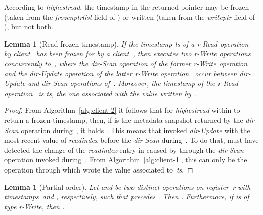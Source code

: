\documentclass[oribibl]{llncs}
\newtheorem{lemma}[theorem]{Lemma}
\theoremstyle{definition-boldhead}
\newcommand{\var}[1]{\textit{#1}}
\newcommand{\op}[1]{\textsl{#1}}
\newcommand{\dir}{\var{dir}\xspace}
\begin{document}
According to \op{highestread}, the timestamp in the returned pointer
may be frozen (taken from the \var{frozenptrlist} field of ) or written
(taken from the \var{writeptr} field of ), but not both.

\begin{lemma}[Read frozen timestamp]\label{lem:readfrozen}
  If the timestamp \var{ts} of a \var{r}-\op{Read} operation~ by
  client~ has been frozen for  by a client~, then 
  executes two \var{r}-\op{Write} operations concurrently to~,
  where the \dir-\op{Scan} operation of the former \var{r}-\op{Write}
  operation~ and the \dir-\op{Update} operation of the latter
  \var{r}-\op{Write} operation~ occur between
  \dir-\op{Update} and \dir-\op{Scan} operations of~.  Moreover,
  the timestamp of the \var{r}-\op{Read} operation~ is \var{ts},
  the one associated with the value written by~.
\end{lemma}

\begin{proof}
  From Algorithm~\ref{alg:client-2} it follows that for
  \op{highestread} within  to return a frozen timestamp, then, if
   is the metadata snapshot returned by the \dir-\op{Scan}
  operation during~, it holds . This means that  invoked \dir-\op{Update} with
  the most recent value of \var{readindex} before the \dir-\op{Scan}
  during~. To do that,  must have detected the change of the
  \var{readindex} entry in  caused by  through the
  \dir-\op{Scan} operation invoked during~. From
  Algorithm~\ref{alg:client-1}, this can only be the operation through
  which  wrote the value associated to~\var{ts}.
\end{proof}


\begin{lemma}[Partial order]\label{lem:partorder}
  Let \opr and \popr be two distinct operations on register~\var{r}
  with timestamps~\tsopr and \tspopr, respectively, such that \opr
  precedes \popr. Then .  Furthermore, if \popr
  is of type \var{r}-\op{Write}, then .
\end{lemma}
\end{document}
